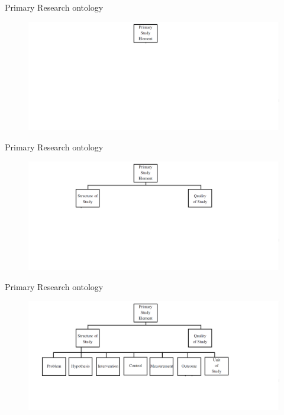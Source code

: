 \documentclass[16:9,en,navbarside]{sdqbeamer}
\begin{document}
\begin{frame}{Primary Research ontology}
    \begin{figure}
		\includegraphics[width=12cm]{images/SROnt1.PNG}
	\end{figure}
\end{frame}

\begin{frame}{Primary Research ontology}
    \begin{figure}
		\includegraphics[width=12cm]{images/SROnt2.PNG}
	\end{figure}
\end{frame}

\begin{frame}{Primary Research ontology}
    \begin{figure}
		\includegraphics[width=12cm]{images/SROnt3.PNG}
	\end{figure}
\end{frame}
\end{document}
